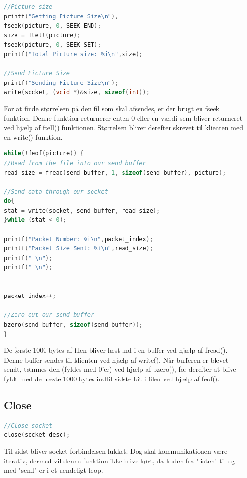 \documentclass[12pt,fleqn,a4paper]{report}
\begin{document}
\begin{framed}
\begin{lstlisting}[language=C++]
//Picture size
printf("Getting Picture Size\n");
fseek(picture, 0, SEEK_END);
size = ftell(picture);
fseek(picture, 0, SEEK_SET);
printf("Total Picture size: %i\n",size);

//Send Picture Size
printf("Sending Picture Size\n");
write(socket, (void *)&size, sizeof(int));
\end{lstlisting}
\end{framed}
For at finde størrelsen på den fil som skal afsendes, er der brugt en fseek funktion. Denne funktion returnerer enten 0 eller en værdi som bliver returneret ved hjælp af ftell() funktionen. 
Størrelsen bliver derefter skrevet til klienten med en write() funktion.
\newpage
\begin{framed}
\begin{lstlisting}[language=C++]
while(!feof(picture)) {
//Read from the file into our send buffer
read_size = fread(send_buffer, 1, sizeof(send_buffer), picture);
	
//Send data through our socket
do{
stat = write(socket, send_buffer, read_size);
}while (stat < 0);
	
printf("Packet Number: %i\n",packet_index);
printf("Packet Size Sent: %i\n",read_size);
printf(" \n");
printf(" \n");
	
	
packet_index++;
	
//Zero out our send buffer
bzero(send_buffer, sizeof(send_buffer));
}
\end{lstlisting}
\end{framed}
De første 1000 bytes af filen bliver læst ind i en buffer ved hjælp af fread(). Denne buffer sendes til klienten ved hjælp af write(). Når bufferen er blevet sendt, tømmes den (fyldes med 0'er) ved hjælp af bzero(), for derefter at blive fyldt med de næste 1000 bytes indtil sidste bit i filen ved hjælp af feof().

 
\subsection{Close}
\begin{framed}
\begin{lstlisting}[language=C++]
//Close socket
close(socket_desc);
\end{lstlisting}
\end{framed}

Til sidst bliver socket forbindelsen lukket.
Dog skal kommunikationen være iterativ, dermed vil denne funktion ikke blive kørt, da koden fra "listen" til og med "send" er i et uendeligt loop.
\newpage
\end{document}
